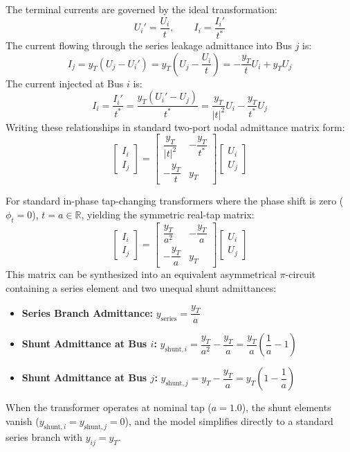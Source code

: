 \documentclass[12pt,a4paper,oneside]{report}
\begin{document}
The terminal currents are governed by the ideal transformation:
\begin{equation}
U_i' = \frac{U_i}{t}, \qquad I_i = \frac{I_i'}{t^*}
\end{equation}
The current flowing through the series leakage admittance into Bus $j$ is:
\begin{equation}
I_j = y_T (U_j - U_i') = y_T \left(U_j - \frac{U_i}{t}\right) = -\frac{y_T}{t} U_i + y_T U_j
\end{equation}
The current injected at Bus $i$ is:
\begin{equation}
I_i = \frac{I_i'}{t^*} = \frac{y_T (U_i' - U_j)}{t^*} = \frac{y_T}{|t|^2} U_i - \frac{y_T}{t^*} U_j
\end{equation}
Writing these relationships in standard two-port nodal admittance matrix form:
\begin{equation}
\begin{bmatrix} I_i \\ I_j \end{bmatrix} = \begin{bmatrix} \dfrac{y_T}{|t|^2} & -\dfrac{y_T}{t^*} \\ -\dfrac{y_T}{t} & y_T \end{bmatrix} \begin{bmatrix} U_i \\ U_j \end{bmatrix}
\end{equation}

For standard in-phase tap-changing transformers where the phase shift is zero ($\phi_t = 0$), $t = a \in \mathbb{R}$, yielding the symmetric real-tap matrix:
\begin{equation}
\begin{bmatrix} I_i \\ I_j \end{bmatrix} = \begin{bmatrix} \dfrac{y_T}{a^2} & -\dfrac{y_T}{a} \\ -\dfrac{y_T}{a} & y_T \end{bmatrix} \begin{bmatrix} U_i \\ U_j \end{bmatrix}
\end{equation}
This matrix can be synthesized into an equivalent asymmetrical $\pi$-circuit containing a series element and two unequal shunt admittances:
\begin{itemize}
    \item \textbf{Series Branch Admittance:} $y_{\text{series}} = \dfrac{y_T}{a}$
    \item \textbf{Shunt Admittance at Bus $i$:} $y_{\text{shunt}, i} = \dfrac{y_T}{a^2} - \dfrac{y_T}{a} = \dfrac{y_T}{a}\left(\dfrac{1}{a} - 1\right)$
    \item \textbf{Shunt Admittance at Bus $j$:} $y_{\text{shunt}, j} = y_T - \dfrac{y_T}{a} = y_T \left(1 - \dfrac{1}{a}\right)$
\end{itemize}
When the transformer operates at nominal tap ($a = 1.0$), the shunt elements vanish ($y_{\text{shunt}, i} = y_{\text{shunt}, j} = 0$), and the model simplifies directly to a standard series branch with $y_{ij} = y_T$.
\end{document}
